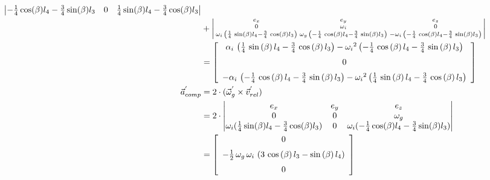 \begin{align*}
\begin{vmatrix}
-\frac{1}{4}\cos(\beta)l_{4}-\frac{3}{4}\sin(\beta)l_{3}&0&\frac{1}{4}\sin(\beta)l_{4}-\frac{3}{4}\cos(\beta)l_{3}\\
\end{vmatrix}\\
&+\left|\begin{smallmatrix}
e_{x}&e_{y}&e_{z}\\
0&\omega_{i}&0\\
\omega_{i}\, \left( \frac{1}{4}\,\sin \left( \beta \right) l_{4}-\frac{3}{4}\,\cos \left( \beta \right) l_{3} \right)&\omega_{g}\, \left(-\frac{1}{4}\,\cos \left( \beta \right) l_{4}-\frac{3}{4}\,\sin \left( \beta \right) l_{3} \right)&-\omega_{i}\, \left( -\frac{1}{4}\,\cos \left( \beta \right) l_{4}-\frac{3}{4}\,\sin \left( \beta \right) l_{3} \right)\\
\end{smallmatrix}\right|\\
&=\left[ \begin {array}{c} \alpha_{i}\, \left( \frac{1}{4}\,\sin \left( \beta \right) l_{4}-\frac{3}{4}\,\cos \left( \beta \right) l_{3} \right) -{\omega_{i}}^{2} \left( -\frac{1}{4}\,\cos \left( \beta \right) l_{4}-\frac{3}{4}\,\sin \left(\beta \right) l_{3} \right) \\ \noalign{\medskip}0
\\ \noalign{\medskip}-\alpha_{i}\, \left( -\frac{1}{4}\,\cos \left( \beta \right) l_{4}-\frac{3}{4}\,\sin \left( \beta \right) l_{3} \right) -{\omega_{i}}^{2} \left( \frac{1}{4}\,\sin \left( \beta \right) l_{4}-\frac{3}{4}\,\cos \left(\beta \right) l_{3} \right) \end {array} \right]
\\
\vec{a}_{comp}^{'}&=2\cdot(\vec{\omega}_{g}^{'}\times\vec{v}_{rel}^{'})\\
&=2\cdot
\begin{vmatrix}
e_{x}&e_{y}&e_{z}\\
0&0&\omega_{g}\\
\omega_{i}(\frac{1}{4}\sin(\beta)l_{4}-\frac{3}{4}\cos(\beta)l_{3})&0&\omega_{i}(-\frac{1}{4}\cos(\beta)l_{4}-\frac{3}{4}\sin(\beta)l_{3})\\
\end{vmatrix}\\
&=\left[ \begin {array}{c} 0\\ \noalign{\medskip}-\frac{1}{2}\,\omega_{g}\,\omega_{i}\, \left( 3\,\cos \left( \beta \right) l_{3}-\sin \left(\beta \right) l_{4} \right) \\ \noalign{\medskip}0\end {array} \right]\\

\end{align*}
